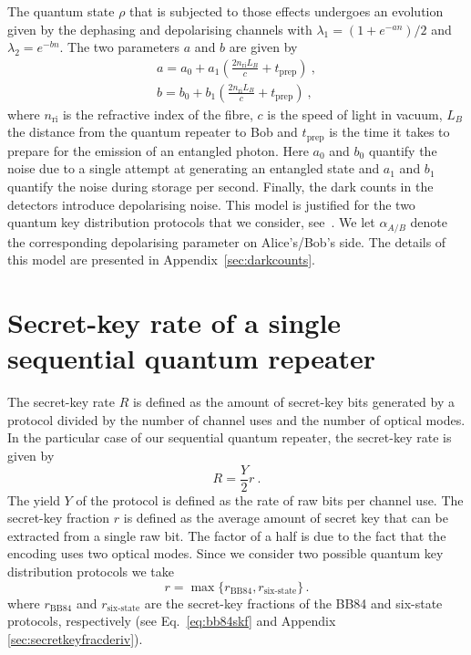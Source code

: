 \documentclass[aps,pra,reprint,superscriptaddress]{revtex4-1}
\begin{document}
The quantum state $\rho$ that is subjected to those effects undergoes an evolution given by the dephasing and depolarising channels 
with $\lambda_1=(1+e^{-an})/2$ and $ \lambda_2= e^{-bn}$. The two parameters $a$ and $b$ are given by
\begin{gather}
a = a_0+a_1\left(\frac{2n_{\textrm{ri}}L_B}{c}+t_{\textrm{prep}}\right)\ ,\\
b = b_0+b_1\left(\frac{2n_{\textrm{ri}}L_B}{c}+t_{\textrm{prep}}\right)\ ,
\end{gather}
where $n_{\textrm{ri}}$ is the refractive index of the fibre, $c$ is the speed of light in vacuum, $L_B$ the distance from the quantum repeater to Bob and $t_{\textrm{prep}}$ is the time it takes to prepare for the emission of an entangled photon. Here $a_0$ and $b_0$ quantify the noise due to a single attempt at generating an entangled state and $a_1$ and $b_1$ quantify the noise during storage per second. 
\label{sec:darkcountsmain}
Finally, the dark counts in the detectors introduce depolarising noise. This model is justified for the two quantum key distribution protocols that we consider, see~\cite{gittsovich2014squashing,beaudry2008squashing}.
We let $\alpha_{A/B}$ denote the corresponding depolarising parameter on Alice's/Bob's side. The details of this model are presented in Appendix~\ref{sec:darkcounts}.










\section{Secret-key rate of a single sequential quantum repeater }
\label{sec:analysis}
The secret-key rate $R$ is defined as the amount of secret-key bits generated by a protocol divided by the number of channel uses and the number of optical modes.
In the particular case of our sequential quantum repeater, the secret-key rate is given by 
\begin{equation}
R = \frac{Y}{2}r\ .
\end{equation} 
The yield $Y$ of the protocol is defined as the rate of raw bits per channel use. The secret-key fraction $r$ is defined as the average amount of secret key that can be extracted from a single raw bit. The factor of a half is due to the fact that the encoding uses two optical modes. 
Since we consider two possible quantum key distribution protocols we take 
\begin{equation}
r = \max\{r_{\text{BB84}}, r_{\text{six-state}}\} \, .
\end{equation}
where $r_{\text{BB84}}$ and $r_{\text{six-state}}$ are the secret-key fractions of the BB84 and six-state protocols, respectively (see Eq.~\eqref{eq:bb84skf} and Appendix \ref{sec:secretkeyfracderiv}).
\end{document}
